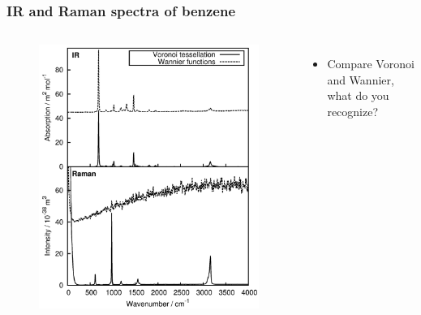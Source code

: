 \documentclass[t]{beamer}
\begin{document}
	\begin{frame}
	    \frametitle{IR and Raman spectra of benzene}
	    \vspace{-.6cm}
	    \begin{columns}
	    \begin{figure}
	    \vspace{-.6cm}
            \includegraphics[width=1.1\textwidth]{figures/benzene_spectra.png}
        \end{figure}
        \vspace{2.5cm}
        \begin{itemize}
            \item Compare Voronoi and Wannier, what do you recognize?
        \end{itemize}
        \end{columns}
	\end{frame}
\end{document}
